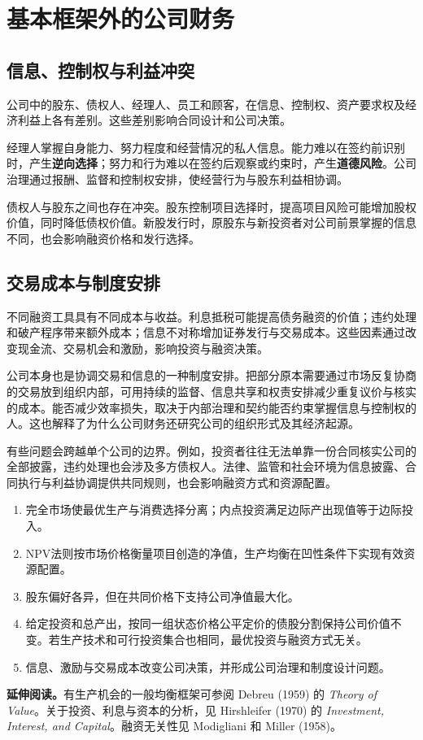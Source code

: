 \section{基本框架外的公司财务}\label{sec:wj-fifteen-4}
\subsection{信息、控制权与利益冲突}
公司中的股东、债权人、经理人、员工和顾客，在信息、控制权、资产要求权及经济利益上各有差别。这些差别影响合同设计和公司决策。

经理人掌握自身能力、努力程度和经营情况的私人信息。能力难以在签约前识别时，产生\textbf{逆向选择}；努力和行为难以在签约后观察或约束时，产生\textbf{道德风险}。公司治理通过报酬、监督和控制权安排，使经营行为与股东利益相协调。

债权人与股东之间也存在冲突。股东控制项目选择时，提高项目风险可能增加股权价值，同时降低债权价值。新股发行时，原股东与新投资者对公司前景掌握的信息不同，也会影响融资价格和发行选择。

\subsection{交易成本与制度安排}
不同融资工具具有不同成本与收益。利息抵税可能提高债务融资的价值；违约处理和破产程序带来额外成本；信息不对称增加证券发行与交易成本。这些因素通过改变现金流、交易机会和激励，影响投资与融资决策。

公司本身也是协调交易和信息的一种制度安排。把部分原本需要通过市场反复协商的交易放到组织内部，可用持续的监督、信息共享和权责安排减少重复议价与核实的成本。能否减少效率损失，取决于内部治理和契约能否约束掌握信息与控制权的人。这也解释了为什么公司财务还研究公司的组织形式及其经济起源。

有些问题会跨越单个公司的边界。例如，投资者往往无法单靠一份合同核实公司的全部披露，违约处理也会涉及多方债权人。法律、监管和社会环境为信息披露、合同执行与利益协调提供共同规则，也会影响融资方式和资源配置。

\WJChapterSummary
\begin{tcolorbox}[summary]
\begin{enumerate}
 \item 完全市场使最优生产与消费选择分离；内点投资满足边际产出现值等于边际投入。
 \item NPV法则按市场价格衡量项目创造的净值，生产均衡在凹性条件下实现有效资源配置。
 \item 股东偏好各异，但在共同价格下支持公司净值最大化。
 \item 给定投资和总产出，按同一组状态价格公平定价的债股分割保持公司价值不变。若生产技术和可行投资集合也相同，最优投资与融资方式无关。
 \item 信息、激励与交易成本改变公司决策，并形成公司治理和制度设计问题。
\end{enumerate}
\end{tcolorbox}

\textbf{延伸阅读。}有生产机会的一般均衡框架可参阅 Debreu (1959) 的 \emph{Theory of Value}。关于投资、利息与资本的分析，见 Hirshleifer (1970) 的 \emph{Investment, Interest, and Capital}。融资无关性见 Modigliani 和 Miller (1958)。
\fi
\WJChapterExercises

\endgroup
